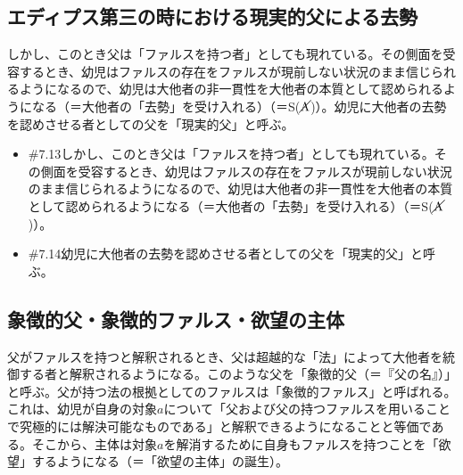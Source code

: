 \subsection{エディプス第三の時における現実的父による去勢}\label{ux30a8ux30c7ux30a3ux30d7ux30b9ux7b2cux4e09ux306eux6642ux306bux304aux3051ux308bux73feux5b9fux7684ux7236ux306bux3088ux308bux53bbux52e2}

しかし、このとき父は「ファルスを持つ者」としても現れている。その側面を受容するとき、幼児はファルスの存在をファルスが現前しない状況のまま信じられるようになるので、幼児は大他者の非一貫性を大他者の本質として認められるようになる（＝大他者の「去勢」を受け入れる）（＝S(\(\cancel{\textrm{A}}\))）。幼児に大他者の去勢を認めさせる者としての父を「現実的父」と呼ぶ。

\begin{note}{}
  \begin{itemize}
    \tightlist
    \item{\#7.13}しかし、このとき父は「ファルスを持つ者」としても現れている。その側面を受容するとき、幼児はファルスの存在をファルスが現前しない状況のまま信じられるようになるので、幼児は大他者の非一貫性を大他者の本質として認められるようになる（＝大他者の「去勢」を受け入れる）（＝S($\cancel{\textrm{A}}$)）。
    \item{\#7.14}幼児に大他者の去勢を認めさせる者としての父を「現実的父」と呼ぶ。
  \end{itemize}
\end{note}

\subsection{象徴的父・象徴的ファルス・欲望の主体}\label{ux8c61ux5fb4ux7684ux7236ux8c61ux5fb4ux7684ux30d5ux30a1ux30ebux30b9ux6b32ux671bux306eux4e3bux4f53}

父がファルスを持つと解釈されるとき、父は超越的な「法」によって大他者を統御する者と解釈されるようになる。このような父を「象徴的父（＝『父の名』）」と呼ぶ。父が持つ法の根拠としてのファルスは「象徴的ファルス」と呼ばれる。これは、幼児が自身の対象\(a\)について「父および父の持つファルスを用いることで究極的には解決可能なものである」と解釈できるようになることと等価である。そこから、主体は対象\(a\)を解消するために自身もファルスを持つことを「欲望」するようになる（＝「欲望の主体」の誕生）。

